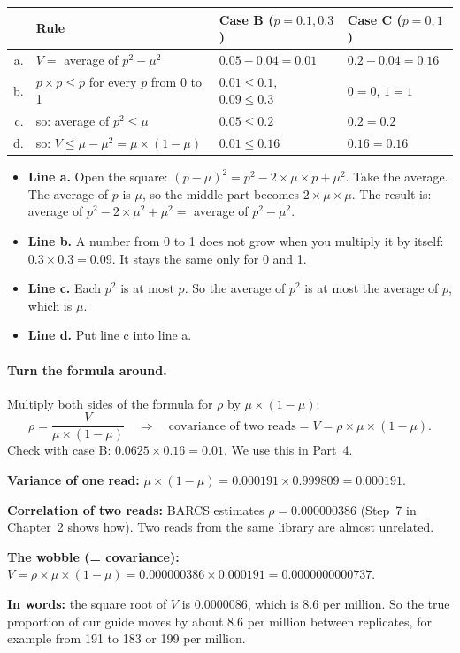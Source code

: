 \begin{center}
\small
\renewcommand{\arraystretch}{1.35}
\begin{tabular}{@{}r@{\;}l l l@{}}
\toprule
& \textbf{Rule} & \textbf{Case B} ($p = 0.1, 0.3$) & \textbf{Case C} ($p = 0, 1$)\\
\midrule
a. & $V = $ average of $p^2 - \mu^2$ & $0.05 - 0.04 = 0.01$ & $0.2 - 0.04 = 0.16$\\
b. & $p \times p \le p$ for every $p$ from 0 to 1 & $0.01 \le 0.1$, $0.09 \le 0.3$ & $0 = 0$, $1 = 1$\\
c. & so: average of $p^2 \le \mu$ & $0.05 \le 0.2$ & $0.2 = 0.2$\\
d. & so: $V \le \mu - \mu^2 = \mu \times (1-\mu)$ & $0.01 \le 0.16$ & $0.16 = 0.16$\\
\bottomrule
\end{tabular}
\end{center}

\begin{itemize}
\item \textbf{Line a.} Open the square:
  $(p-\mu)^2 = p^2 - 2 \times \mu \times p + \mu^2$. Take the average. The
  average of $p$ is $\mu$, so the middle part becomes
  $2 \times \mu \times \mu$. The result is: average of
  $p^2 - 2 \times \mu^2 + \mu^2 = $ average of $p^2 - \mu^2$.
\item \textbf{Line b.} A number from 0 to 1 does not grow when you multiply
  it by itself: $0.3 \times 0.3 = 0.09$. It stays the same only for 0 and 1.
\item \textbf{Line c.} Each $p^2$ is at most $p$. So the average of $p^2$ is
  at most the average of $p$, which is $\mu$.
\item \textbf{Line d.} Put line c into line a.
\end{itemize}

\paragraph{Turn the formula around.} Multiply both sides of the formula for
$\rho$ by $\mu \times (1-\mu)$:
\[
\rho = \frac{V}{\mu \times (1-\mu)}
\quad\Longrightarrow\quad
\text{covariance of two reads} = V = \rho \times \mu \times (1-\mu).
\]
Check with case B: $0.0625 \times 0.16 = 0.01$. We use this in Part~4.

\begin{worked}
\textbf{Variance of one read:} $\mu \times (1-\mu) = 0.000191 \times
0.999809 = 0.000191$.

\textbf{Correlation of two reads:} BARCS estimates $\rho = 0.000000386$
(Step~7 in Chapter~2 shows how). Two reads from the same library are almost
unrelated.

\textbf{The wobble (= covariance):} $V = \rho \times \mu \times (1-\mu) =
0.000000386 \times 0.000191 = 0.0000000000737$.

\textbf{In words:} the square root of $V$ is $0.0000086$, which is 8.6 per
million. So the true proportion of our guide moves by about 8.6 per million
between replicates, for example from 191 to 183 or 199 per million.
\end{worked}

